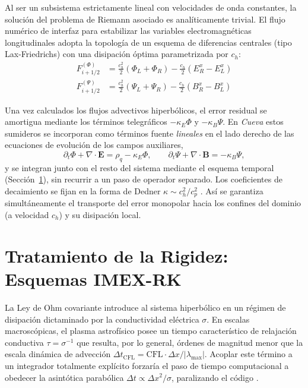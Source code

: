 \primerparrafo Al ser un subsistema estrictamente lineal con velocidades de onda constantes, la solución del problema de Riemann asociado es analíticamente trivial. El flujo numérico de interfaz para estabilizar las variables electromagnéticas longitudinales adopta la topología de un esquema de diferencias centrales (tipo Lax-Friedrichs) \parencite{toro-2009} con una disipación óptima parametrizada por $c_h$:
\begin{align}
    F_{i+1/2}^{(\Phi)} &= \frac{c_h^2}{2} (\Phi_L + \Phi_R) - \frac{c_h}{2} (E^x_R - E^x_L) \\
    F_{i+1/2}^{(\Psi)} &= \frac{c_h^2}{2} (\Psi_L + \Psi_R) - \frac{c_h}{2} (B^x_R - B^x_L)
\end{align}

Una vez calculados los flujos advectivos hiperbólicos, el error residual se amortigua mediante los términos telegráficos $-\kappa_E \Phi$ y $-\kappa_B \Psi$. En \textit{Cueva} estos sumideros se incorporan como términos fuente \emph{lineales} en el lado derecho de las ecuaciones de evolución de los campos auxiliares,
\begin{equation}
    \partial_t \Phi + \nabla\cdot\mathbf{E} = \rho_q - \kappa_E \Phi, \qquad \partial_t \Psi + \nabla\cdot\mathbf{B} = - \kappa_B \Psi,
\end{equation}
y se integran junto con el resto del sistema mediante el esquema temporal (Sección~\ref{sec:IMEX_RK}), sin recurrir a un paso de operador separado. Los coeficientes de decaimiento se fijan en la forma de Dedner $\kappa \sim c_h^2/c_p^2$ \parencite{Dedner_etal:2002}. Así se garantiza simultáneamente el transporte del error monopolar hacia los confines del dominio (a velocidad $c_h$) y su disipación local.

\section{Tratamiento de la Rigidez: Esquemas IMEX-RK}
\label{sec:IMEX_RK}

\primerparrafo La Ley de Ohm covariante introduce al sistema hiperbólico en un régimen de disipación dictaminado por la conductividad eléctrica $\sigma$. En escalas macroscópicas, el plasma astrofísico posee un tiempo característico de relajación conductiva $\tau = \sigma^{-1}$ que resulta, por lo general, órdenes de magnitud menor que la escala dinámica de advección $\Delta t_{\text{CFL}} = \text{CFL} \cdot \Delta x / |\lambda_{\max}|$. Acoplar este término a un integrador totalmente explícito forzaría el paso de tiempo computacional a obedecer la asintótica parabólica $\Delta t \propto \Delta x^2 / \sigma$, paralizando el código \parencite{palenzuela-2009}.

